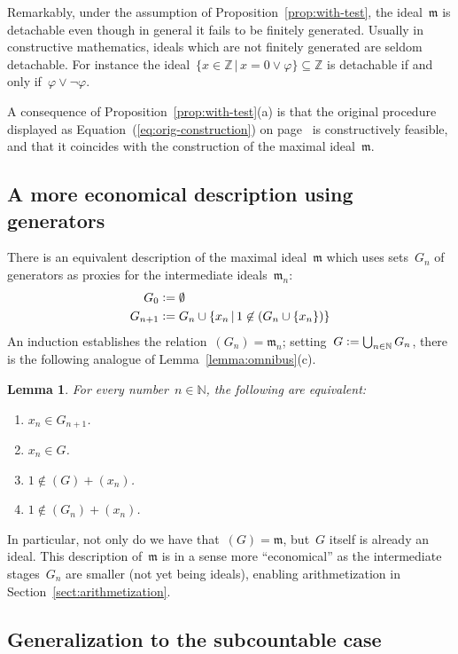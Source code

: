 \documentclass[com,11pt,crcready]{iosart2x}
\theoremstyle{definition}
\theoremstyle{plain}
\newtheorem{lemma}[definition]{Lemma}
\theoremstyle{remark}
\newcommand{\?}{\,{:}\,}
\newcommand{\mmm}{\mathfrak{m}}
\newcommand{\NN}{\mathbb{N}}
\newcommand{\ZZ}{\mathbb{Z}}
\newcommand{\defeq}{\vcentcolon=}
\renewcommand{\_}{\mathpunct{.}\,}
\begin{document}
Remarkably, under the assumption of Proposition~\ref{prop:with-test}, the ideal~$\mmm$ is detachable even though in
general it fails to be finitely generated. Usually in constructive mathematics, ideals which are not
finitely generated are seldom detachable. For instance the ideal~$\{ x \in
\ZZ \,|\, x = 0 \vee \varphi \} \subseteq \ZZ$ is detachable if and only
if~$\varphi \vee \neg\varphi$.

A consequence of Proposition~\ref{prop:with-test}(a) is that the original
procedure displayed as Equation~(\ref{eq:orig-construction}) on
page~\pageref{eq:orig-construction} is constructively feasible, and that it
coincides with the construction of the maximal ideal~$\mmm$.


\subsection{A more economical description using generators}

There is an equivalent description of the
maximal ideal~$\mmm$ which uses sets~$G_n$ of generators as proxies for the
intermediate ideals~$\mmm_n$:
\begin{align*}
  G_0 &\defeq \emptyset \\
  G_{n+1} &\defeq G_n \cup \{ x_n \,|\, 1 \not\in (G_n \cup \{ x_n \}) \}
\end{align*}
An induction establishes the relation~$(G_n) = \mmm_n$; setting~$G \defeq
\bigcup_{n\in\NN} G_n$, there is the following analogue of
Lemma~\ref{lemma:omnibus}(c).

\begin{lemma}\label{lemma:via-generators}For every number~$n \in \NN$, the following are equivalent:
\begin{enumerate}
\item[(1)] $x_n \in G_{n+1}$.
\item[(2)] $x_n \in G$.
\item[(3)] $1 \not\in (G) + (x_n)$.
\item[(4)] $1 \not\in (G_n) + (x_n)$.
\end{enumerate}
\end{lemma}

In particular, not only do we have that~$(G) = \mmm$, but~$G$ itself is already
an ideal. This description of~$\mmm$ is in a sense more ``economical'' as the
intermediate stages~$G_n$ are smaller (not yet being ideals), enabling
arithmetization in Section~\ref{sect:arithmetization}.


\subsection{Generalization to the subcountable case}
\label{sect:subcountable}
\end{document}
